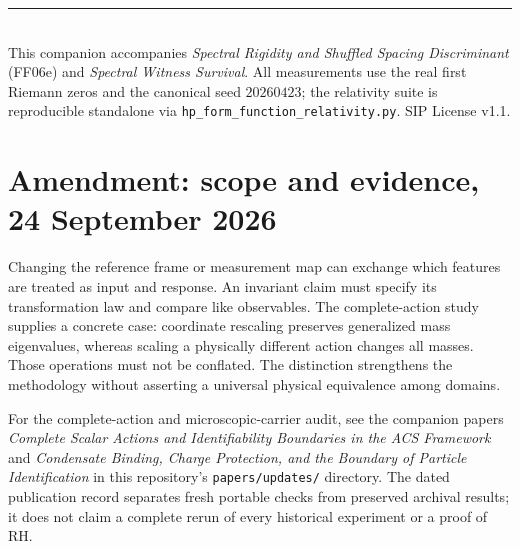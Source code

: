\documentclass[11pt]{article}
\theoremstyle{definition}
\theoremstyle{plain}
\begin{document}
\vspace{1em}
\noindent\rule{\linewidth}{0.4pt}\\
\small This companion accompanies \textit{Spectral Rigidity and Shuffled Spacing Discriminant} (FF06e) and \textit{Spectral Witness Survival}. All measurements use the real first Riemann zeros and the canonical seed $20260423$; the relativity suite is reproducible standalone via \nolinkurl{hp_form_function_relativity.py}. SIP License v1.1.


\section*{Amendment: scope and evidence, 24 September 2026}
Changing the reference frame or measurement map can exchange which features are treated as input and response. An invariant claim must specify its transformation law and compare like observables. The complete-action study supplies a concrete case: coordinate rescaling preserves generalized mass eigenvalues, whereas scaling a physically different action changes all masses. Those operations must not be conflated. The distinction strengthens the methodology without asserting a universal physical equivalence among domains.

For the complete-action and microscopic-carrier audit, see the companion
papers \emph{Complete Scalar Actions and Identifiability Boundaries in the ACS
Framework} and \emph{Condensate Binding, Charge Protection, and the Boundary
of Particle Identification} in this repository's \texttt{papers/updates/}
directory. The dated publication record separates fresh portable checks
from preserved archival results; it does not claim a complete rerun of every
historical experiment or a proof of RH.
\end{document}
